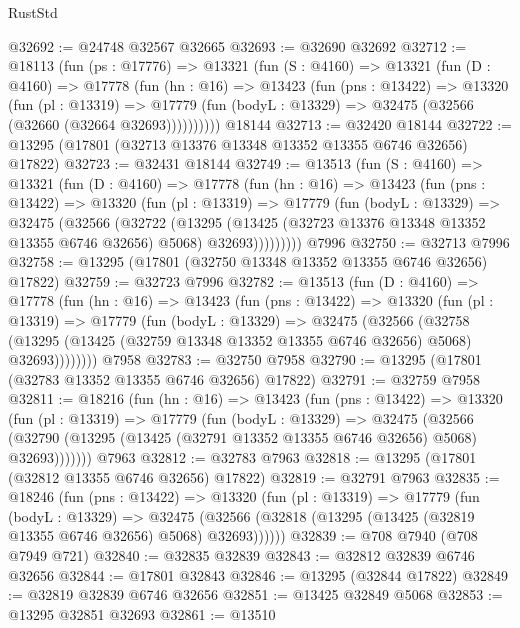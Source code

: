 \begin{lexlean}{RustStd}
\begin{coremodule}
@32692 := @24748 @32567 @32665
@32693 := @32690 @32692
@32712 := @18113
    (fun (ps : @17776) =>
    @13321
      (fun (S : @4160) =>
      @13321
        (fun (D : @4160) =>
        @17778
          (fun (hn : @16) =>
          @13423
            (fun (pns : @13422) =>
            @13320
              (fun (pl : @13319) =>
              @17779 (fun (bodyL : @13329) => @32475 (@32566 (@32660 (@32664 @32693))))))))))
    @18144
@32713 := @32420 @18144
@32722 := @13295 (@17801 (@32713 @13376 @13348 @13352 @13355 @6746 @32656) @17822)
@32723 := @32431 @18144
@32749 := @13513
    (fun (S : @4160) =>
    @13321
      (fun (D : @4160) =>
      @17778
        (fun (hn : @16) =>
        @13423
          (fun (pns : @13422) =>
          @13320
            (fun (pl : @13319) =>
            @17779
              (fun (bodyL : @13329) =>
              @32475
                (@32566
                  (@32722
                    (@13295
                      (@13425 (@32723 @13376 @13348 @13352 @13355 @6746 @32656) @5068)
                      @32693)))))))))
    @7996
@32750 := @32713 @7996
@32758 := @13295 (@17801 (@32750 @13348 @13352 @13355 @6746 @32656) @17822)
@32759 := @32723 @7996
@32782 := @13513
    (fun (D : @4160) =>
    @17778
      (fun (hn : @16) =>
      @13423
        (fun (pns : @13422) =>
        @13320
          (fun (pl : @13319) =>
          @17779
            (fun (bodyL : @13329) =>
            @32475
              (@32566
                (@32758
                  (@13295 (@13425 (@32759 @13348 @13352 @13355 @6746 @32656) @5068) @32693))))))))
    @7958
@32783 := @32750 @7958
@32790 := @13295 (@17801 (@32783 @13352 @13355 @6746 @32656) @17822)
@32791 := @32759 @7958
@32811 := @18216
    (fun (hn : @16) =>
    @13423
      (fun (pns : @13422) =>
      @13320
        (fun (pl : @13319) =>
        @17779
          (fun (bodyL : @13329) =>
          @32475
            (@32566 (@32790 (@13295 (@13425 (@32791 @13352 @13355 @6746 @32656) @5068) @32693)))))))
    @7963
@32812 := @32783 @7963
@32818 := @13295 (@17801 (@32812 @13355 @6746 @32656) @17822)
@32819 := @32791 @7963
@32835 := @18246
    (fun (pns : @13422) =>
    @13320
      (fun (pl : @13319) =>
      @17779
        (fun (bodyL : @13329) =>
        @32475 (@32566 (@32818 (@13295 (@13425 (@32819 @13355 @6746 @32656) @5068) @32693))))))
@32839 := @708 @7940 (@708 @7949 @721)
@32840 := @32835 @32839
@32843 := @32812 @32839 @6746 @32656
@32844 := @17801 @32843
@32846 := @13295 (@32844 @17822)
@32849 := @32819 @32839 @6746 @32656
@32851 := @13425 @32849 @5068
@32853 := @13295 @32851 @32693
@32861 := @13510

\end{coremodule}
\end{lexlean}
